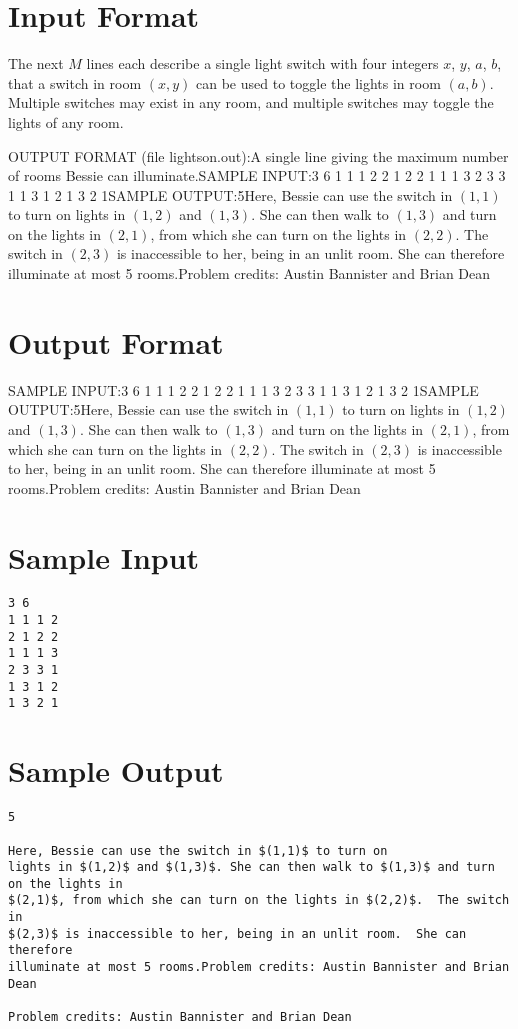 \documentclass[12pt]{article}
\begin{document}
\section*{Input Format}
The next $M$ lines each describe a single light switch
with four integers $x$, $y$, $a$, $b$, that a switch in room $(x,y)$
can be used to toggle the lights in room $(a,b)$.  Multiple switches
may exist in any room, and multiple switches may toggle the lights of
any room.

OUTPUT FORMAT (file
lightson.out):A single line giving the maximum number of rooms Bessie can
illuminate.SAMPLE INPUT:3 6
1 1 1 2
2 1 2 2
1 1 1 3
2 3 3 1
1 3 1 2
1 3 2 1SAMPLE OUTPUT:5Here, Bessie can use the switch in $(1,1)$ to turn on 
lights in $(1,2)$ and $(1,3)$. She can then walk to $(1,3)$ and turn on the lights in 
$(2,1)$, from which she can turn on the lights in $(2,2)$.  The switch in 
$(2,3)$ is inaccessible to her, being in an unlit room.  She can therefore 
illuminate at most 5 rooms.Problem credits: Austin Bannister and Brian Dean

\section*{Output Format}
SAMPLE INPUT:3 6
1 1 1 2
2 1 2 2
1 1 1 3
2 3 3 1
1 3 1 2
1 3 2 1SAMPLE OUTPUT:5Here, Bessie can use the switch in $(1,1)$ to turn on 
lights in $(1,2)$ and $(1,3)$. She can then walk to $(1,3)$ and turn on the lights in 
$(2,1)$, from which she can turn on the lights in $(2,2)$.  The switch in 
$(2,3)$ is inaccessible to her, being in an unlit room.  She can therefore 
illuminate at most 5 rooms.Problem credits: Austin Bannister and Brian Dean

\section*{Sample Input}
\begin{verbatim}
3 6
1 1 1 2
2 1 2 2
1 1 1 3
2 3 3 1
1 3 1 2
1 3 2 1
\end{verbatim}

\section*{Sample Output}
\begin{verbatim}
5

Here, Bessie can use the switch in $(1,1)$ to turn on 
lights in $(1,2)$ and $(1,3)$. She can then walk to $(1,3)$ and turn on the lights in 
$(2,1)$, from which she can turn on the lights in $(2,2)$.  The switch in 
$(2,3)$ is inaccessible to her, being in an unlit room.  She can therefore 
illuminate at most 5 rooms.Problem credits: Austin Bannister and Brian Dean

Problem credits: Austin Bannister and Brian Dean
\end{verbatim}
\end{document}
